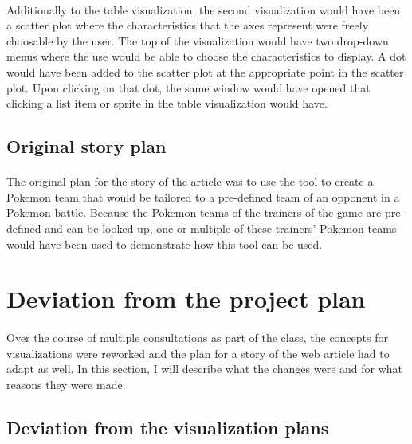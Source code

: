 \documentclass[12pt, a4paper]{article}
\begin{document}
			\paragraph{}
				Additionally to the table visualization, the second visualization would have been a scatter plot where the characteristics that the axes represent were freely choosable by the user. The top of the visualization would have two drop-down menus where the use would be able to choose the characteristics to display. A dot would have been added to the scatter plot at the appropriate point in the scatter plot. Upon clicking on that dot, the same window would have opened that clicking a list item or sprite in the table visualization would have.
		\subsection{Original story plan}
			\paragraph{}
				The original plan for the story of the article was to use the tool to create a Pokemon team that would be tailored to a pre-defined team of an opponent in a Pokemon battle. Because the Pokemon teams of the trainers of the game are pre-defined and can be looked up, one or multiple of these trainers' Pokemon teams would have been used to demonstrate how this tool can be used.
	\section{Deviation from the project plan}
		\paragraph{}
			Over the course of multiple consultations as part of the class, the concepts for visualizations were reworked and the plan for a story of the web article had to adapt as well. In this section, I will describe what the changes were and for what reasons they were made.
		\subsection{Deviation from the visualization plans}
\end{document}
